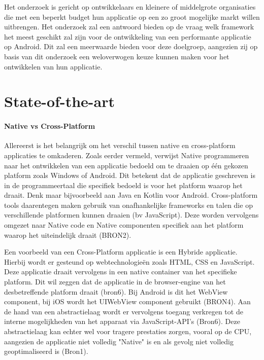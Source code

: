 Het onderzoek is gericht op ontwikkelaars en kleinere of middelgrote organisaties die met een beperkt budget hun applicatie op een zo groot mogelijke markt willen uitbrengen. Het onderzoek zal een antwoord bieden op de vraag welk framework het meest geschikt zal zijn voor de ontwikkeling van een performante applicatie op Android. Dit zal een meerwaarde bieden voor deze doelgroep, aangezien zij op basis van dit onderzoek een weloverwogen keuze kunnen maken voor het ontwikkelen van hun applicatie.


\section{State-of-the-art}%
\label{sec:state-of-the-art}

\paragraph{Native vs Cross-Platform}
\newline
Allereerst is het belangrijk om het verschil tussen native en cross-platform applicaties te omkaderen. Zoals eerder vermeld, verwijst Native programmeren naar het ontwikkelen van een applicatie bedoeld om te draaien op één gekozen platform zoals Windows of Android. Dit betekent dat de applicatie geschreven is in de programmeertaal die specifiek bedoeld is voor het platform waarop het draait. Denk maar bijvoorbeeld aan Java en Kotlin voor Android. Cross-platform tools daarentegen maken gebruik van onafhankelijke frameworks en talen die op verschillende platformen kunnen draaien (bv JavaScript). Deze worden vervolgens omgezet naar Native code en Native componenten specifiek aan het platform waarop het uiteindelijk draait (BRON2).

Een voorbeeld van een Cross-Platform applicatie is een Hybride applicatie. Hierbij wordt er gesteund op webtechnologieën zoals HTML, CSS en JavaScript. Deze applicatie draait vervolgens in een native container van het specifieke platform. Dit wil zeggen dat de applicatie in de browser-engine van het desbetreffende platform draait (bron6). Bij Android is dit het WebView component, bij iOS wordt het UIWebView component gebruikt (BRON4). Aan de hand van een abstractielaag wordt er vervolgens toegang verkregen tot de interne mogelijkheden van het apparaat via JavaScript-API's (Bron6). Deze abstractielaag kan echter wel voor tragere prestaties zorgen, vooral op de CPU, aangezien de applicatie niet volledig "Native" is en als gevolg niet volledig geoptimaliseerd is (Bron1).

